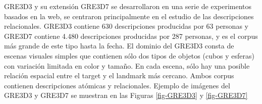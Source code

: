 \label{sec:corpusGRE}
GRE3D3 y su extensi\'on GRE3D7 \cite{gre3d3,gre3d7} se desarrollaron en una serie de experimentos basados en la web, se centraron principalmente en el estudio de las descripciones relacionales. GRE3D3 contiene 630 descripciones producidas por 63 personas y GRE3D7 contiene 4.480 descripciones producidas por 287 personas, y es el corpus m\'as grande de este tipo hasta la fecha. El dominio del GRE3D3 consta de escenas visuales simples que contienen s\'olo dos tipos de objetos (cubos y esferas) con variaci\'on limitada en color y tama\~no. En cada escena, s\'olo hay una posible relaci\'on espacial entre el target y el landmark m\'as cercano. Ambos corpus contienen descripciones at\'omicas y relacionales. Ejemplo de im\'agenes del GRE3D3 y GRE3D7 se muestran en las Figuras \ref{fig-GRE3D3} y \ref{fig-GRE3D7}

